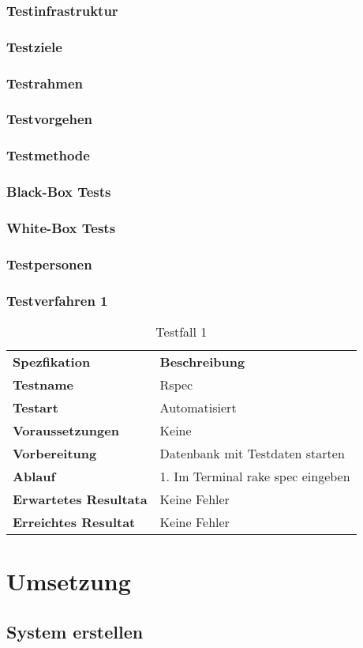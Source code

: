 \subsection{Testinfrastruktur}
\subsection{Testziele}
\subsection{Testrahmen}
\subsection{Testvorgehen}
\subsection{Testmethode}
\subsection{Black-Box Tests}
\subsection{White-Box Tests}
\subsection{Testpersonen}
\subsection{Testverfahren 1}
\begin{table}[H]
    \begin{tabular}{|l|l|}
        \hline
        \rowcolor{puzzleblue} \multicolumn{2}{|l|}{Testfall Nr. 1}  \\[10pt]
        \hline
        \textbf{Spezfikation} & \textbf{Beschreibung} \\
        \hline
        \rowcolor{puzzleblue!25}\textbf{Testname} & Rspec \\
        \hline
        \textbf{Testart} & Automatisiert \\
        \hline
        \rowcolor{puzzleblue!25}\textbf{Voraussetzungen} & Keine \\
        \hline
        \textbf{Vorbereitung} & Datenbank mit Testdaten starten \\
        \hline
        \rowcolor{puzzleblue!25}\textbf{Ablauf} & 1. Im Terminal rake spec eingeben \\
        \hline
        \textbf{Erwartetes Resultata} & Keine Fehler \\
        \hline
        \rowcolor{puzzleblue!25}\textbf{Erreichtes Resultat} & Keine Fehler \\
        \hline
    \end{tabular}
    \caption{Testfall 1}
\end{table}
\chapter{Umsetzung}
\section{System erstellen}
